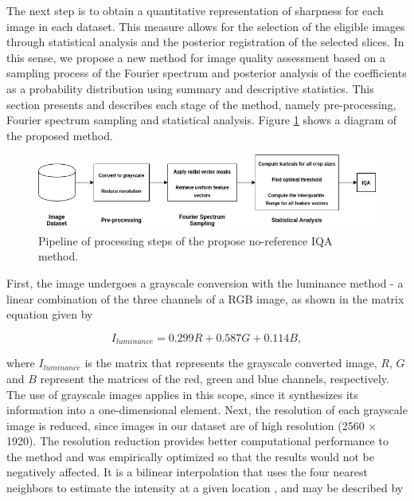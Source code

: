 The next step is to obtain a quantitative representation of sharpness for each image in each dataset. This measure allows for the selection of the eligible images through statistical analysis and the posterior registration of the selected slices. In this sense, we propose a new method for image quality assessment based on a sampling process of the Fourier spectrum and posterior analysis of the coefficients as a probability distribution using summary and descriptive statistics. This section presents and describes each stage of the method, namely pre-processing, Fourier spectrum sampling and statistical analysis. Figure \ref{fig:pipeline} shows a diagram of the proposed method.

\begin{figure}[ht]
  \centering
  \includegraphics[scale=0.6]{images/nr-iqa_pipeline.png}
  \caption{Pipeline of processing steps of the propose no-reference IQA method.}
  \label{fig:pipeline}
\end{figure}

First, the image undergoes a grayscale conversion with the luminance method \cite{ponti2016image} - a 
linear combination of the three channels of a RGB image, as shown in the matrix equation given by

\begin{equation}
    \label{eqn:luminance}
    I_{luminance} = 0.299R + 0.587G + 0.114B,
\end{equation}

\noindent where $I_{luminance}$ is the matrix that represents the grayscale converted image, $R$, $G$ and $B$ represent the matrices of the red, green and blue channels, respectively. The use of grayscale images applies in this scope, since it synthesizes its information into a one-dimensional element. Next, the resolution of each grayscale image is reduced, since images in our dataset are of high resolution (2560 $\times$ 1920). The resolution reduction provides better computational performance to the method and was empirically optimized so that the results would not be negatively affected. It is a bilinear interpolation that uses the four nearest neighbors to estimate the intensity at a given location \cite{gonzalez2018digital}, and may be described by

